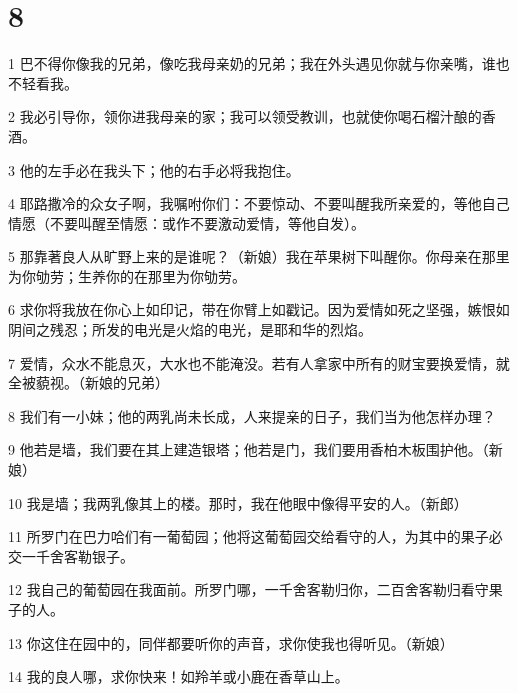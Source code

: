 \chapter{8}

\par 1 巴不得你像我的兄弟，像吃我母亲奶的兄弟；我在外头遇见你就与你亲嘴，谁也不轻看我。
\par 2 我必引导你，领你进我母亲的家；我可以领受教训，也就使你喝石榴汁酿的香酒。
\par 3 他的左手必在我头下；他的右手必将我抱住。
\par 4 耶路撒冷的众女子啊，我嘱咐你们：不要惊动、不要叫醒我所亲爱的，等他自己情愿（不要叫醒至情愿：或作不要激动爱情，等他自发）。
\par 5 那靠著良人从旷野上来的是谁呢？（新娘）我在苹果树下叫醒你。你母亲在那里为你劬劳；生养你的在那里为你劬劳。
\par 6 求你将我放在你心上如印记，带在你臂上如戳记。因为爱情如死之坚强，嫉恨如阴间之残忍；所发的电光是火焰的电光，是耶和华的烈焰。
\par 7 爱情，众水不能息灭，大水也不能淹没。若有人拿家中所有的财宝要换爱情，就全被藐视。（新娘的兄弟）
\par 8 我们有一小妹；他的两乳尚未长成，人来提亲的日子，我们当为他怎样办理？
\par 9 他若是墙，我们要在其上建造银塔；他若是门，我们要用香柏木板围护他。（新娘）
\par 10 我是墙；我两乳像其上的楼。那时，我在他眼中像得平安的人。（新郎）
\par 11 所罗门在巴力哈们有一葡萄园；他将这葡萄园交给看守的人，为其中的果子必交一千舍客勒银子。
\par 12 我自己的葡萄园在我面前。所罗门哪，一千舍客勒归你，二百舍客勒归看守果子的人。
\par 13 你这住在园中的，同伴都要听你的声音，求你使我也得听见。（新娘）
\par 14 我的良人哪，求你快来！如羚羊或小鹿在香草山上。


